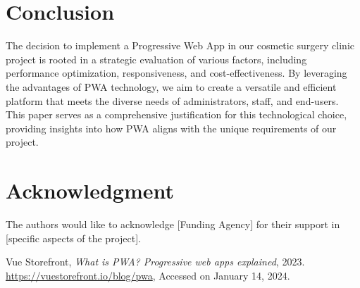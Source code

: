 \documentclass[conference]{IEEEtran}
\begin{document}
\section{Conclusion}
The decision to implement a Progressive Web App in our cosmetic surgery clinic project is rooted in a strategic evaluation of various factors, including performance optimization, responsiveness, and cost-effectiveness. By leveraging the advantages of PWA technology, we aim to create a versatile and efficient platform that meets the diverse needs of administrators, staff, and end-users. This paper serves as a comprehensive justification for this technological choice, providing insights into how PWA aligns with the unique requirements of our project.



\section*{Acknowledgment}
The authors would like to acknowledge [Funding Agency] for their support in [specific aspects of the project].

\begin{thebibliography}{00}
    Vue Storefront,
    \emph{What is PWA? Progressive web apps explained},
    2023.
    \url{https://vuestorefront.io/blog/pwa}, Accessed on January 14, 2024.
\end{thebibliography}
\end{document}
